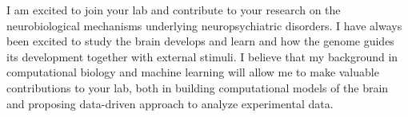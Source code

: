 


I am excited to join your lab and contribute to your research on the neurobiological mechanisms underlying neuropsychiatric disorders.
I have always been excited to study the brain develops and learn and how the genome guides its development together with external stimuli.
I believe that my background in computational biology and machine learning will allow me to make valuable contributions to your lab, both in building computational models of the brain and proposing data-driven approach to analyze experimental data.
